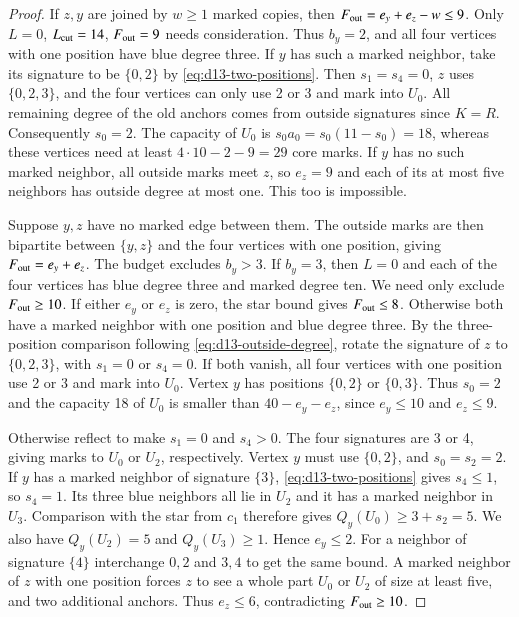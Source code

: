 \documentclass[preprint,11pt,numbers]{elsarticle-arxiv}
\numberwithin{equation}{section}
\theoremstyle{definition}
\begin{document}
\begin{proof}
If $z,y$ are joined by $w\ge1$ marked copies, then
$F_{\rm out}=e_y+e_z-w\le9$. Only $L=0$, $L_{\rm cut}=14$,
$F_{\rm out}=9$ needs consideration. Thus $b_y=2$, and all four
vertices with one position have blue degree three. If $y$ has such a
marked neighbor, take its signature to be $\{0,2\}$ by
\eqref{eq:d13-two-positions}. Then $s_1=s_4=0$, $z$ uses $\{0,2,3\}$,
and the four vertices can only use 2 or 3 and mark into $U_0$.
All remaining degree of the old anchors comes from outside signatures
since $K=R$. Consequently $s_0=2$. The capacity of $U_0$ is
$s_0a_0=s_0(11-s_0)=18$, whereas these vertices need at least
$4\cdot10-2-9=29$ core marks. If $y$ has no such marked neighbor,
all outside marks meet $z$, so $e_z=9$ and each of its at most five
neighbors has outside degree at most one. This too is impossible.

Suppose $y,z$ have no marked edge between them. The outside marks
are then bipartite between $\{y,z\}$ and the four vertices with one
position, giving $F_{\rm out}=e_y+e_z$. The budget excludes $b_y>3$.
If $b_y=3$, then $L=0$ and each of the four vertices has blue degree
three and marked degree ten. We need only exclude $F_{\rm out}\ge10$.
If either $e_y$ or $e_z$ is zero, the star bound gives
$F_{\rm out}\le8$. Otherwise both have a marked neighbor with one
position and blue degree three. By the three-position comparison
following \eqref{eq:d13-outside-degree}, rotate the signature of $z$
to $\{0,2,3\}$, with $s_1=0$ or $s_4=0$. If both vanish, all four
vertices with one position use 2 or 3 and mark into $U_0$.
Vertex $y$ has positions $\{0,2\}$ or $\{0,3\}$. Thus $s_0=2$
and the capacity 18 of $U_0$ is smaller than $40-e_y-e_z$, since
$e_y\le10$ and $e_z\le9$.

Otherwise reflect to make $s_1=0$ and $s_4>0$. The four signatures
are 3 or 4, giving marks to $U_0$ or $U_2$, respectively. Vertex
$y$ must use $\{0,2\}$, and $s_0=s_2=2$. If $y$ has a marked neighbor
of signature $\{3\}$, \eqref{eq:d13-two-positions} gives $s_4\le1$,
so $s_4=1$. Its three blue neighbors all lie in $U_2$ and it has a
marked neighbor in $U_3$. Comparison with the star from $c_1$
therefore gives $Q_y(U_0)\ge3+s_2=5$. We also have $Q_y(U_2)=5$ and
$Q_y(U_3)\ge1$. Hence $e_y\le2$. For a neighbor of signature
$\{4\}$ interchange $0,2$ and $3,4$ to get the same bound.
A marked neighbor of $z$ with one position forces $z$ to see a
whole part $U_0$ or $U_2$ of size at least five, and two additional
anchors. Thus $e_z\le6$, contradicting $F_{\rm out}\ge10$.


\end{proof}
\end{document}
